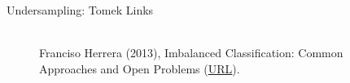 \begin{frame}{Undersampling: Tomek Links}
{\begin{minipage}{0.55\textwidth}
\begin{itemize}
			\end{itemize}		
			\end{minipage}
%		
			\begin{minipage}{0.4\textwidth}
				\begin{figure}
					\centering
								\tiny
					\\ Franciso Herrera (2013), Imbalanced Classification: Common
					Approaches and Open Problems (\href{https://sci2s.ugr.es/sites/default/files/files/TutorialsAndPlenaryTalks/SSTiC-Trends in-Classification-Imbalanced-data-sets.pdf}{\underline{URL}}).
				\end{figure}
			\end{minipage}
		}
	\end{frame}
	
	
	
